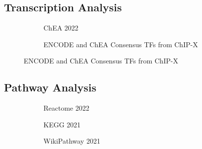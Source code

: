\documentclass[11pt]{article}
\begin{document}
    \newpage
    \hypertarget{transcription-analysis}{%
\subsection{Transcription Analysis}\label{transcription-analysis}}
\begin{figure}
  \begin{center}
      \begin{subfigure}{.5\textwidth}
          \caption{ChEA 2022}\label{fig:chea-2022}
      \end{subfigure}%
      \hspace*{.1in}
      \begin{subfigure}{.5\textwidth}
          \caption{ENCODE and ChEA Consensus TFs from ChIP-X}\label{fig:encode-chea}
      \end{subfigure}
  \end{center}
\end{figure}
    \hypertarget{pathway-analysis}{%
\subsection{Pathway Analysis}\label{pathway-analysis}}
\begin{figure}
  \begin{center}
      \begin{subfigure}{.5\textwidth}
          \caption{Reactome 2022}\label{fig:reactome-2022}
      \end{subfigure}%
      \hspace*{.1in}
      \begin{subfigure}{.5\textwidth}
          \caption{KEGG 2021}\label{fig:KEGG-2021}
      \end{subfigure}
      \hfill
  \end{center}
  \begin{subfigure}{.5\textwidth}
    \caption{WikiPathway 2021}\label{fig:wikipathway-2021}
  \end{subfigure}
  \hspace*{.1in}
  \begin{subfigure}{.5\textwidth}
  \end{subfigure}
\end{figure}
\end{document}
